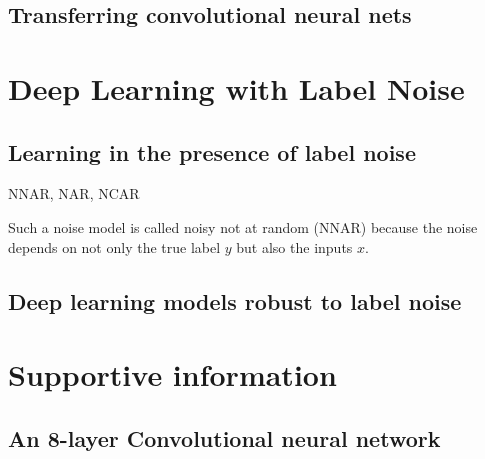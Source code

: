 \subsection{Transferring convolutional neural nets}


\section{Deep Learning with Label Noise}
\subsection{Learning in the presence of label noise}

NNAR, NAR, NCAR

Such a noise model is called noisy not at random (NNAR) \cite{frenay2014classification} because the noise depends on not only the true label $y$ but also the inputs $x$.

\subsection{Deep learning models robust to label noise}


\section{Supportive information}

\subsection{An 8-layer Convolutional neural network}


